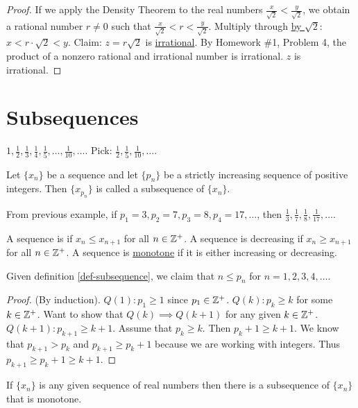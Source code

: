\documentclass[]{article}
\begin{document}
\begin{proof}
	If we apply the Density Theorem to the real numbers $\frac{x}{\sqrt{2}} < \frac{y}{\sqrt{2}}$, we obtain a rational number $r\neq 0$ such that $\frac{x}{\sqrt{2}} < r < \frac{y}{\sqrt{2}}$. Multiply through \ul{by $\sqrt{2}$}: $x< r\cdot \sqrt{2} < y$. Claim: $z = r\sqrt{2}$ is \ul{irrational}. By Homework \#1, Problem 4, the product of a nonzero rational and irrational number is irrational. $z$ is irrational.
\end{proof}

\section*{Subsequences}

\begin{example}
	$1,\frac{1}{2},\frac{1}{3},\frac{1}{4},\frac{1}{5},\dots,\frac{1}{10},\dots$. Pick: $\frac{1}{2},\frac{1}{5},\frac{1}{10},\dots$.
\end{example}
\begin{definition}
	Let $\{x_n\}$ be a sequence and let $\{p_n\}$ be a strictly increasing sequence of positive integers. Then $\{x_{p_n}\}$ is called a subsequence of $\{x_n\}$.
	\label{def-subsequence}
\end{definition}
\begin{example}
	From previous example, if $p_1 = 3, p_2=7,p_3=8,p_4=17,\dots$, then $\frac{1}{3},\frac{1}{7},\frac{1}{8},\frac{1}{17},\dots$.
\end{example}
\begin{definition}
	A sequence is  if $x_n\leq x_{n+1}$ for all $n\in\mathbb{Z}^+$.
	A sequence is decreasing if $x_n\geq x_{n+1}$ for all $n\in\mathbb{Z}^+$.
	A sequence is \ul{monotone} if it is either increasing or decreasing.
\end{definition}
\begin{proposition}
	Given definition \ref{def-subsequence}, we claim that $n\leq p_n$ for $n=1,2,3,4,\dots$.
\end{proposition}
\begin{proof}
	(By induction). $Q(1):p_1\geq 1$ since $p_1\in\mathbb{Z}^+$. $Q(k): p_k\geq k$ for some $k\in\mathbb{Z}^+$. Want to show that $Q(k)\implies Q(k+1)$ for any given $k\in\mathbb{Z}^+$. $Q(k+1): p_{k+1} \geq k+1$. Assume that $p_k\geq k$. Then $p_k+1 \geq k+1$. We know that $p_{k+1} > p_k$ and  $p_{k+1} \geq p_k + 1$ because we are working with integers. Thus $p_{k+1} \geq p_k+1 \geq k+1$.
\end{proof}
\begin{theorem}
	 If $\{x_n\}$ is any given sequence of real numbers then there is a subsequence of $\{x_n\}$ that is monotone.
\end{theorem}
\end{document}
